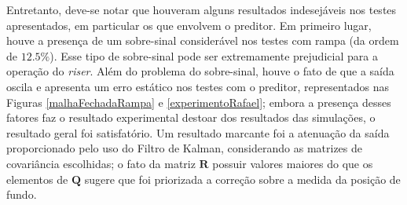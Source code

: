 Entretanto, deve-se notar que houveram alguns resultados indesejáveis nos testes apresentados, em particular os que envolvem o preditor. Em primeiro lugar, houve a presença de um sobre-sinal considerável nos testes com rampa (da ordem de $12.5\%$). Esse tipo de sobre-sinal pode ser extremamente prejudicial para a operação do \textit{riser}. Além do problema do sobre-sinal, houve o fato de que a saída oscila e apresenta um erro estático nos testes com o preditor, representados nas Figuras \ref{malhaFechadaRampa} e \ref{experimentoRafael}; embora a presença desses fatores faz o resultado experimental destoar dos resultados das simulações, o resultado geral foi satisfatório. Um resultado marcante foi a atenuação da saída proporcionado pelo uso do Filtro de Kalman, considerando as matrizes de covariância escolhidas; o fato da matriz $\mathbf{R}$ possuir valores maiores do que os elementos de $\mathbf{Q}$ sugere que foi priorizada a correção sobre a medida da posição de fundo.


